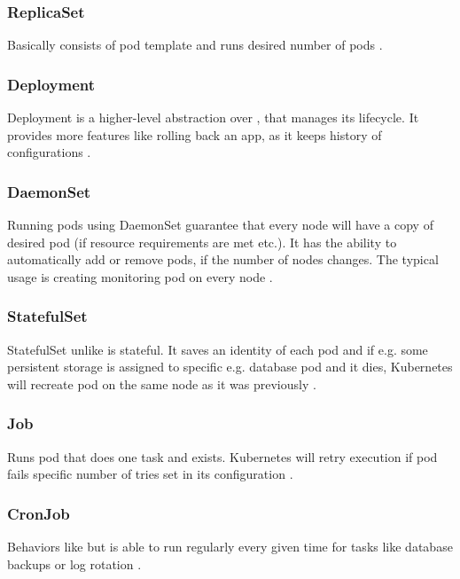 \subsubsection{ReplicaSet}
\label{replicaset}

Basically \textit{} consists of pod template and runs desired number of pods \cite{KubernetesReplicaSet}. 


\subsubsection{Deployment}
\label{deployment}

Deployment is a higher-level abstraction over \textit{}, that manages its lifecycle. It provides more features like rolling back an app, as it keeps history of configurations \cite{KubernetesDeployments}.

\subsubsection{DaemonSet}
\label{daemonset}

Running pods using DaemonSet guarantee that every node will have a copy of desired pod (if resource requirements are met etc.). It has the ability to automatically add or remove pods, if the number of nodes changes. The typical usage is creating monitoring pod on every node \cite{KubernetesDaemonSet}. 


\subsubsection{StatefulSet}
\label{statefulset}

StatefulSet unlike \textit{} is stateful. It saves an identity of each pod and if e.g. some persistent storage is assigned to specific e.g. database pod and it dies, Kubernetes will recreate pod on the same node as it was previously \cite{KubernetesStatefulSet}.

\subsubsection{Job}
\label{job}

Runs pod that does one task and exists. Kubernetes will retry execution if pod fails specific number of tries set in its configuration \cite{KubernetesJobs}.

\subsubsection{CronJob}
\label{cronjob}
Behaviors like \textit{} but is able to run regularly every given time for tasks like database backups or log rotation \cite{KubernetesCronJob}. 


